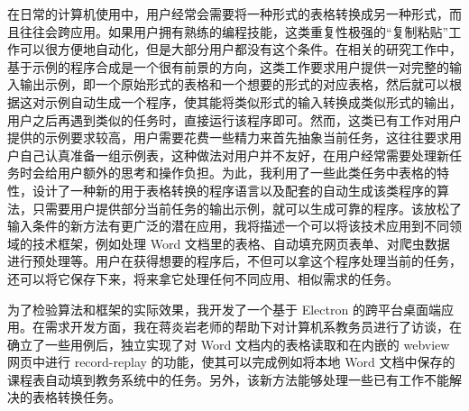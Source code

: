 \documentclass[design, pageheader]{njubachelor}
\begin{document}
\makectitlepage

\begin{cabstract}
在日常的计算机使用中，用户经常会需要将一种形式的表格转换成另一种形式，而且往往会跨应用。如果用户拥有熟练的编程技能，这类重复性极强的“复制粘贴”工作可以很方便地自动化，但是大部分用户都没有这个条件。在相关的研究工作中，基于示例的程序合成是一个很有前景的方向，这类工作要求用户提供一对完整的输入输出示例，即一个原始形式的表格和一个想要的形式的对应表格，然后就可以根据这对示例自动生成一个程序，使其能将类似形式的输入转换成类似形式的输出，用户之后再遇到类似的任务时，直接运行该程序即可。然而，这类已有工作对用户提供的示例要求较高，用户需要花费一些精力来首先抽象当前任务，这往往要求用户自己认真准备一组示例表，这种做法对用户并不友好，在用户经常需要处理新任务时会给用户额外的思考和操作负担。为此，我利用了一些此类任务中表格的特性，设计了一种新的用于表格转换的程序语言以及配套的自动生成该类程序的算法，只需要用户提供部分当前任务的输出示例，就可以生成可靠的程序。该放松了输入条件的新方法有更广泛的潜在应用，我将描述一个可以将该技术应用到不同领域的技术框架，例如处理 Word 文档里的表格、自动填充网页表单、对爬虫数据进行预处理等。用户在获得想要的程序后，不但可以拿这个程序处理当前的任务，还可以将它保存下来，将来拿它处理任何不同应用、相似需求的任务。

为了检验算法和框架的实际效果，我开发了一个基于 Electron 的跨平台桌面端应用。在需求开发方面，我在蒋炎岩老师的帮助下对计算机系教务员进行了访谈，在确立了一些用例后，独立实现了对 Word 文档内的表格读取和在内嵌的 webview 网页中进行 record-replay 的功能，使其可以完成例如将本地 Word 文档中保存的课程表自动填到教务系统中的任务。另外，该新方法能够处理一些已有工作不能解决的表格转换任务。
\end{cabstract}
\end{document}
